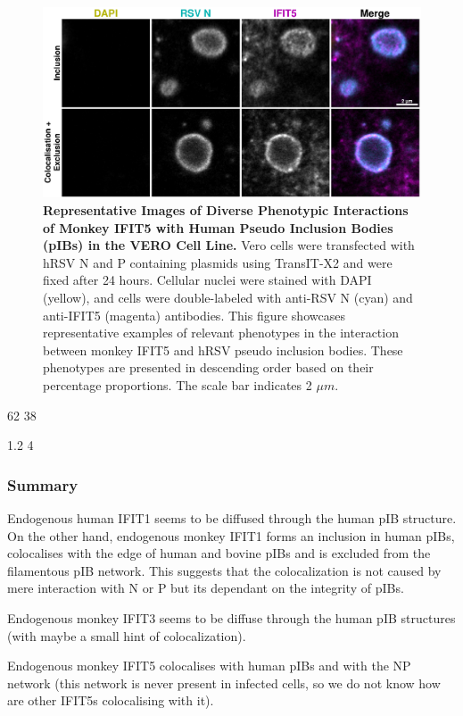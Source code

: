 \begin{figure}
    \centering
    \includegraphics[width=1\linewidth]{08. Chapter 3/Figs/03. pIB/05. IFIT5/03. i5-vero-hnhp.pdf}
    \caption[Representative Images of Diverse Phenotypic Interactions of Monkey IFIT5 with Human Pseudo Inclusion Bodies (pIBs) in the VERO Cell Line.]{\textbf{Representative Images of Diverse Phenotypic Interactions of Monkey IFIT5 with Human Pseudo Inclusion Bodies (pIBs) in the VERO Cell Line.} Vero cells were transfected with hRSV N and P containing plasmids using TransIT-X2 and were fixed after 24 hours. Cellular nuclei were stained with DAPI (yellow), and cells were double-labeled with anti-RSV N (cyan) and anti-IFIT5 (magenta) antibodies. This figure showcases representative examples of relevant phenotypes in the interaction between monkey IFIT5 and hRSV pseudo inclusion bodies. These phenotypes are presented in descending order based on their percentage proportions. The scale bar indicates 2 \(\mu m\).}
    \label{fig:Representative Images of Diverse Phenotypic Interactions of Monkey IFIT5 with Human Pseudo Inclusion Bodies (pIBs) in the VERO Cell Line}
\end{figure}

62 38

1.2 4

\subsubsection{Summary} \label{Summary-pib}
Endogenous human IFIT1 seems to be diffused through the human pIB structure. On the other hand, endogenous monkey IFIT1 forms an inclusion in human pIBs, colocalises with the edge of human and bovine pIBs and is excluded from the filamentous pIB network. This suggests that the colocalization is not caused by mere interaction with N or P but its dependant on the integrity of pIBs.

Endogenous monkey IFIT3 seems to be diffuse through the human pIB structures (with maybe a small hint of colocalization).

Endogenous monkey IFIT5 colocalises with human pIBs and with the NP network (this network is never present in infected cells, so we do not know how are other IFIT5s colocalising with it).
